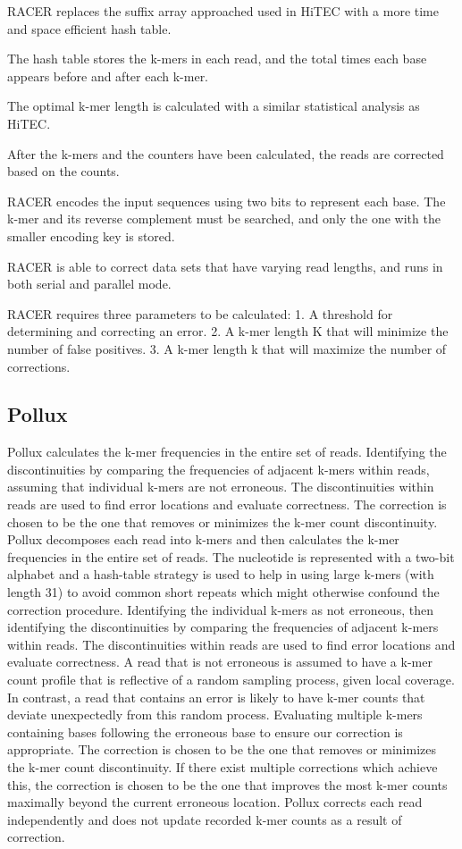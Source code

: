\documentclass{llncs}
\begin{document}
RACER replaces the suffix array approached used in HiTEC with a more time and space efficient hash table. 

The hash table stores the k-mers in each read, and the total times each base appears before and after each k-mer.

The optimal k-mer length is calculated with a similar statistical analysis as HiTEC.

After the k-mers and the counters have been calculated, the reads are corrected
based on the counts.

RACER encodes the input sequences using two bits to represent each base.
The k-mer and its reverse complement must be searched, and only the one with the smaller encoding key is stored. 


RACER is able to correct data sets that have varying read lengths, and runs in both serial and parallel mode.


RACER requires three parameters to be calculated:
1. A threshold for determining and correcting an error.
2. A k-mer length K that will minimize the number of false positives.
3. A k-mer length k that will maximize the number of corrections. 
\subsection{Pollux}
Pollux \cite{Pollux} calculates the k-mer frequencies in the entire set of reads. Identifying the discontinuities by comparing the frequencies of adjacent k-mers within reads, assuming that individual k-mers are not erroneous. The discontinuities within reads are used to find error locations and evaluate correctness. The correction is chosen to be the one that removes or minimizes the k-mer count discontinuity.
Pollux decomposes each read into k-mers and then calculates the k-mer frequencies in the entire set of reads. The nucleotide is represented with a two-bit alphabet and a hash-table strategy is used to help in using large k-mers (with length 31) to avoid common short repeats which might otherwise confound the correction procedure.
Identifying the individual k-mers as not erroneous, then identifying the discontinuities by comparing the frequencies of adjacent k-mers within reads. The discontinuities within reads are used to find error locations and evaluate correctness. A read that is not erroneous is assumed to have a k-mer count profile that is reflective of a random sampling process, given local coverage. In contrast, a read that contains an error is likely to have k-mer counts that deviate unexpectedly from this random process. Evaluating multiple k-mers containing bases following the erroneous base to ensure our correction is appropriate. The correction is chosen to be the one that removes or minimizes the k-mer count discontinuity. If there exist multiple corrections which achieve this, the correction is chosen to be the one that improves the most k-mer counts maximally beyond the current erroneous location. Pollux corrects each read independently and does not update recorded k-mer counts as a result of correction.
\end{document}
